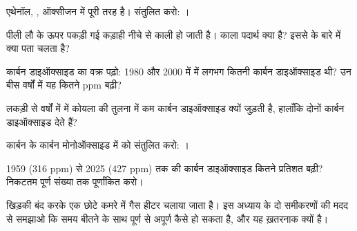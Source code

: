 \begin{exercise}[$\star\star$]\label{exo:g8:combustion-and-fuels:6}
एथेनॉल, , ऑक्सीजन में पूरी तरह  है। संतुलित करो:
। %
\end{exercise}

\begin{exercise}[$\star\star$]\label{exo:g8:combustion-and-fuels:7}
पीली लौ के ऊपर पकड़ी गई कड़ाही नीचे से काली हो जाती है। काला पदार्थ क्या है?
इससे  के बारे में क्या पता चलता है?
\end{exercise}

\begin{exercise}[$\star\star$]\label{exo:g8:combustion-and-fuels:8}
कार्बन डाइऑक्साइड का वक्र पढ़ो: 1980 और 2000 में  में लगभग कितनी कार्बन
डाइऑक्साइड थी? उन बीस वर्षों में यह कितने ppm
बढ़ी?
\end{exercise}

\begin{exercise}[$\star\star$]\label{exo:g8:combustion-and-fuels:9}
लकड़ी  से वर्षों में  में कोयला  की तुलना में कम कार्बन डाइऑक्साइड
क्यों जुड़ती है, हालाँकि दोनों कार्बन डाइऑक्साइड देते हैं?
\end{exercise}

\begin{exercise}[$\star\star$]\label{exo:g8:combustion-and-fuels:10}
कार्बन के कार्बन मोनोऑक्साइड में  को संतुलित करो:
। %
\end{exercise}

\begin{exercise}[$\star\star\star$]\label{exo:g8:combustion-and-fuels:11}
1959 (316 ppm) से 2025 (427 ppm) तक  की कार्बन डाइऑक्साइड कितने
प्रतिशत बढ़ी? निकटतम पूर्ण संख्या तक पूर्णांकित करो।
\end{exercise}

\begin{exercise}[$\star\star\star$]\label{exo:g8:combustion-and-fuels:12}
खिड़की बंद करके एक छोटे कमरे में गैस हीटर चलाया जाता है। इस अध्याय के दो
समीकरणों की मदद से समझाओ कि समय बीतने के साथ  पूर्ण से अपूर्ण कैसे हो
सकता है, और यह ख़तरनाक क्यों है।
\end{exercise}

